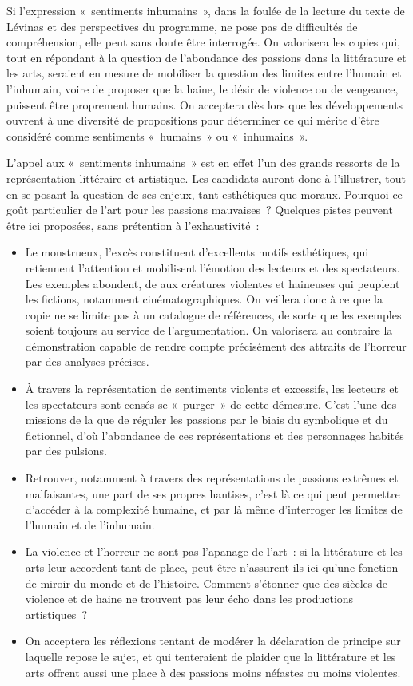 {Si l'expression «~sentiments inhumains~», dans la foulée de la lecture du texte de
Lévinas et des perspectives du programme, ne pose pas de difficultés de
compréhension, elle peut sans doute être interrogée. On valorisera les copies qui, tout
en répondant à la question de l'abondance des passions dans la littérature et les arts,
seraient en mesure de mobiliser la question des limites entre l'humain et l'inhumain,
voire de proposer que la haine, le désir de violence ou de vengeance, puissent être
proprement humains. On acceptera dès lors que les développements ouvrent à une
diversité de propositions pour déterminer ce qui mérite d'être considéré comme
sentiments «~humains~» ou «~inhumains~».

L'appel aux «~sentiments inhumains~» est en effet l'un des grands ressorts de la
représentation littéraire et artistique. Les candidats auront donc à l'illustrer, tout en se
posant la question de ses enjeux, tant esthétiques que moraux. Pourquoi ce goût
particulier de l'art pour les passions mauvaises~?
Quelques pistes peuvent être ici proposées, sans prétention à l'exhaustivité~:

\begin{itemize}
\item Le monstrueux, l'excès constituent d'excellents motifs esthétiques, qui
retiennent l'attention et mobilisent l'émotion des lecteurs et des spectateurs. Les
exemples abondent, de  aux créatures violentes et haineuses qui
peuplent les fictions, notamment cinématographiques. On veillera donc à ce
que la copie ne se limite pas à un catalogue de références, de sorte que les
exemples soient toujours au service de l'argumentation. On valorisera au
contraire la démonstration capable de rendre compte précisément des attraits
de l'horreur par des analyses précises.
\item À travers la représentation de sentiments violents et excessifs, les lecteurs et
les spectateurs sont censés se «~purger~» de cette démesure. C'est l'une des
missions de la  que de réguler les passions par le biais du
symbolique et du fictionnel, d'où l'abondance de ces représentations et des
personnages habités par des pulsions.
\item Retrouver, notamment à travers des représentations de passions extrêmes et
malfaisantes, une part de ses propres hantises, c'est là ce qui peut permettre
d'accéder à la complexité humaine, et par là même d'interroger les limites de
l'humain et de l'inhumain.
\item La violence et l'horreur ne sont pas l'apanage de l'art~: si la littérature et les arts
leur accordent tant de place, peut-être n'assurent-ils ici qu'une fonction de miroir
du monde et de l'histoire. Comment s'étonner que des siècles de violence et de
haine ne trouvent pas leur écho dans les productions artistiques~?
\item On acceptera les réflexions tentant de modérer la déclaration de principe sur
laquelle repose le sujet, et qui tenteraient de plaider que la littérature et les arts
offrent aussi une place à des passions moins néfastes ou moins violentes.
\end{itemize}}

